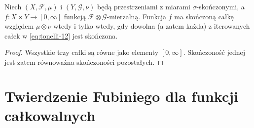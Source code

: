 \begin{wniosek}
\label{cor:tonelli-integrability-12}
Niech $(X,\mathcal F,\mu)$ i $(Y,\mathcal G,\nu)$
będą przestrzeniami z miarami $\sigma$-skończonymi,
a $f:X\times Y\to[0,\infty]$ funkcją
$\mathcal F\otimes\mathcal G$-mierzalną.
Funkcja $f$ ma skończoną całkę
względem $\mu\otimes\nu$ wtedy i tylko wtedy,
gdy dowolna (a zatem każda) z iterowanych całek
w \eqref{eq:tonelli-12} jest skończona.
\end{wniosek}
\begin{proof}
Wszystkie trzy całki są równe jako elementy
$[0,\infty]$. Skończoność jednej jest zatem
równoważna skończoności pozostałych.
\end{proof}

\section{Twierdzenie Fubiniego dla funkcji całkowalnych}

